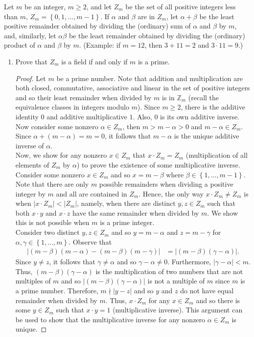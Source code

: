 \documentclass[12pt]{article}
\newcommand{\Z}{\mathbb{Z}}
\newcommand{\Abs}[1]{\left\vert #1 \right\vert}
\newenvironment{problem}[2][Problem]{\begin{trivlist} \item[\hskip \labelsep {\bfseries #1}\hskip \labelsep {\bfseries #2.}]}{\end{trivlist}}
\begin{document}
\begin{problem}{2}
  Let $m$ be an integer, $m\geq 2$, and let $Z_{m}$ be the set of all positive integers less than $m$, $Z_{m}=\left\{ 0,1,\dots,m-1 \right\}$. If $\alpha$ and $\beta$ are in $Z_{m}$, let $\alpha + \beta$ be the least positive remainder obtained by dividing the (ordinary) sum of $\alpha$ and $\beta$ by $m$, and, similarly, let $\alpha\beta$ be the least remainder obtained by dividing the (ordinary) product of $\alpha$ and $\beta$ by $m$. (Example: if $m=12$, then $3+11=2$ and $3\cdot 11 = 9$.)
\begin{enumerate}
  \item Prove that $Z_{m}$ is a field if and only if $m$ is a prime.
\begin{proof}
  Let $m$ be a prime number. Note that addition and multiplication are both closed, commutative, associative and linear in the set of positive integers and so their least remainder when divided by $m$ is in $\Z_{m}$ (recall the equivalence classes in integers modulo $m$). Since $m\geq 2$, there is the additive identity $0$ and additive multiplicative $1$. Also, $0$ is its own additive inverse. Now consider some nonzero $\alpha \in Z_{m}$, then $m> m-\alpha>0$ and $m-\alpha \in Z_{m}$. Since $\alpha + (m-\alpha) = m = 0$, it follows that $m-\alpha$ is the unique additive inverse of $\alpha$.\\
  Now, we show for any nonzero $x\in Z_{m}$ that $x\cdot Z_{m} = Z_{m}$ (multiplication of all elements of $Z_{m}$ by $\alpha$) to prove the existence of some multiplicative inverse. Consider some nonzero $x \in Z_{m}$ and so $x = m-\beta$ where $\beta \in \left\{ 1,\dots,m-1 \right\}$. Note that there are only $m$ possible remainders when dividing a positive integer by $m$ and all are contained in $Z_{m}$. Hence, the only way $x\cdot Z_{m} \neq Z_{m}$ is when $|x\cdot Z_{m}|<|Z_{m}|$, namely, when there are distinct $y,z\in Z_{m}$ such that both $x\cdot y$ and $x\cdot z$ have the same remainder when divided by $m$. We show this is not possible when $m$ is a prime integer.\\
  Consider two distinct $y,z\in Z_{m}$ and so $y=m-\alpha$ and $z=m-\gamma$ for $\alpha,\gamma \in \left\{ 1,\dots,m \right\}$. Observe that 
\begin{align*}
  \Abs{(m-\beta)(m-\alpha) - (m-\beta)(m-\gamma)} &= \Abs{(m-\beta)(\gamma-\alpha)}.
\end{align*}
Since $y\neq z$, it follows that $\gamma \neq \alpha$ and so $\gamma-\alpha \neq 0$. Furthermore, $\Abs{\gamma-\alpha}< m$. Thus, $(m-\beta)(\gamma-\alpha)$ is the multiplication of two numbers that are not multiples of $m$ and so $\Abs{(m-\beta)(\gamma-\alpha)}$ is not a multiple of $m$ since $m$ is a prime number. Therefore, $m\nmid |y-z|$  and so $y$ and $z$ do not have equal remainder when divided by $m$. Thus, $x\cdot Z_{m}$ for any $x\in Z_{m}$ and so there is some $y\in Z_{m}$ such that $x\cdot y = 1$ (multiplicative inverse). This argument can be used to show that the multiplicative inverse for any nonzero $\alpha\in Z_{m}$ is unique.


\end{proof}
\end{enumerate}
\end{problem}
\end{document}
